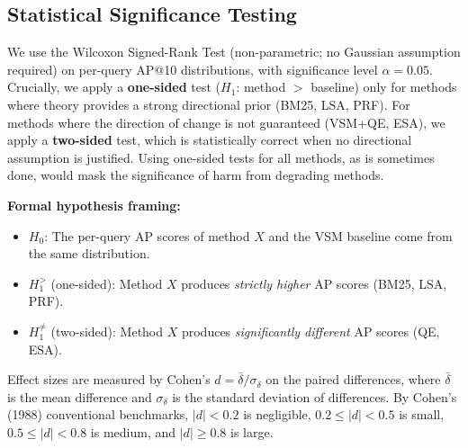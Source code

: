 \documentclass{svproc}
\begin{document}
    \subsection{Statistical Significance Testing}

    We use the Wilcoxon Signed-Rank Test (non-parametric; no Gaussian assumption required) on per-query AP@10 distributions, with significance level $\alpha = 0.05$. Crucially, we apply a \textbf{one-sided} test ($H_1$: method $>$ baseline) only for methods where theory provides a strong directional prior (BM25, LSA, PRF). For methods where the direction of change is not guaranteed (VSM+QE, ESA), we apply a \textbf{two-sided} test, which is statistically correct when no directional assumption is justified. Using one-sided tests for all methods, as is sometimes done, would mask the significance of harm from degrading methods.

    \textbf{Formal hypothesis framing:}

    \begin{itemize}[noitemsep]
        \item $H_0$: The per-query AP scores of method $X$ and the VSM baseline come from the same distribution.
        \item $H_1^{>}$ (one-sided): Method $X$ produces \emph{strictly higher} AP scores (BM25, LSA, PRF).
        \item $H_1^{\neq}$ (two-sided): Method $X$ produces \emph{significantly different} AP scores (QE, ESA).
    \end{itemize}

    Effect sizes are measured by Cohen's $d = \bar{\delta} / \sigma_\delta$ on the paired differences, where $\bar{\delta}$ is the mean difference and $\sigma_\delta$ is the standard deviation of differences. By Cohen's (1988) conventional benchmarks, $|d| < 0.2$ is negligible, $0.2 \le |d| < 0.5$ is small, $0.5 \le |d| < 0.8$ is medium, and $|d| \ge 0.8$ is large.
\end{document}
